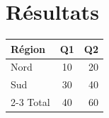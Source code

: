 \documentclass{article}
\begin{document}
\hsize=380pt
\section{R\'esultats}
\begin{tabular}{|l|c|r|}
\hline
R\'egion & Q1 & Q2 \\
\hline
Nord & 10 & 20 \\
Sud & 30 & 40 \\
\cline{2-3}
Total & 40 & 60 \\
\hline
\end{tabular}
\end{document}
